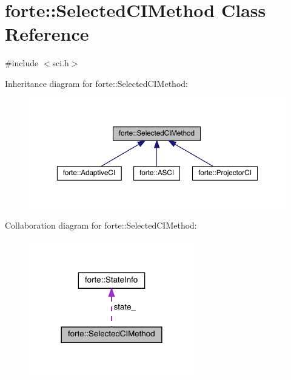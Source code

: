 \hypertarget{classforte_1_1_selected_c_i_method}{}\section{forte\+:\+:Selected\+C\+I\+Method Class Reference}
\label{classforte_1_1_selected_c_i_method}


{\ttfamily \#include $<$sci.\+h$>$}



Inheritance diagram for forte\+:\+:Selected\+C\+I\+Method\+:
\nopagebreak
\begin{figure}[H]
\begin{center}
\leavevmode
\includegraphics[width=350pt]{classforte_1_1_selected_c_i_method__inherit__graph}
\end{center}
\end{figure}


Collaboration diagram for forte\+:\+:Selected\+C\+I\+Method\+:
\nopagebreak
\begin{figure}[H]
\begin{center}
\leavevmode
\includegraphics[width=204pt]{classforte_1_1_selected_c_i_method__coll__graph}
\end{center}
\end{figure}
